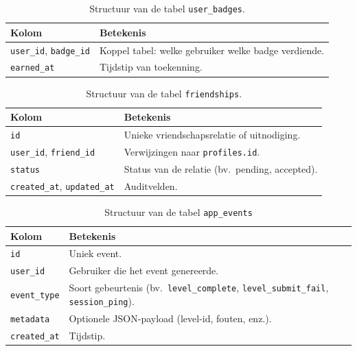\begin{table}[H]
\centering
\small
\begin{tabularx}{\textwidth}{@{}l X@{}}
\hline
\textbf{Kolom} & \textbf{Betekenis} \\
\hline
\texttt{user\_id}, \texttt{badge\_id} & Koppel tabel: welke gebruiker welke badge verdiende. \\
\texttt{earned\_at} & Tijdstip van toekenning. \\
\hline
\end{tabularx}
\caption{Structuur van de tabel \texttt{user\_badges}.}
\label{tab:schema-user-badges}
\end{table}

\begin{table}[H]
\centering
\small
\begin{tabularx}{\textwidth}{@{}l X@{}}
\hline
\textbf{Kolom} & \textbf{Betekenis} \\
\hline
\texttt{id} & Unieke vriendschapsrelatie of uitnodiging. \\
\texttt{user\_id}, \texttt{friend\_id} & Verwijzingen naar \texttt{profiles.id}. \\
\texttt{status} & Status van de relatie (bv.\ pending, accepted). \\
\texttt{created\_at}, \texttt{updated\_at} & Auditvelden. \\
\hline
\end{tabularx}
\caption{Structuur van de tabel \texttt{friendships}.}
\label{tab:schema-friendships}
\end{table}

\begin{table}[H]
\centering
\small
\begin{tabularx}{\textwidth}{@{}l X@{}}
\hline
\textbf{Kolom} & \textbf{Betekenis} \\
\hline
\texttt{id} & Uniek event. \\
\texttt{user\_id} & Gebruiker die het event genereerde. \\
\texttt{event\_type} & Soort gebeurtenis (bv.\ \texttt{level\_complete}, \texttt{level\_submit\_fail}, \texttt{session\_ping}). \\
\texttt{metadata} & Optionele JSON-payload (level-id, fouten, enz.). \\
\texttt{created\_at} & Tijdstip. \\
\hline
\end{tabularx}
\caption{Structuur van de tabel \texttt{app\_events}}
\label{tab:schema-app-events}
\end{table}

